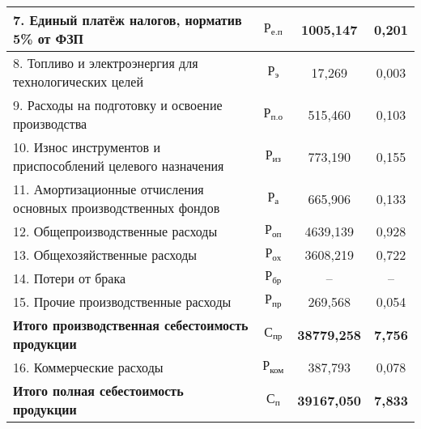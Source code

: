 {\begin{longtable}{| m{10.7cm} | c | c | c |}
      7. Единый платёж налогов, норматив 5\% от ФЗП
      & \( \text{Р}_{\text{е.п}} \) & 1005{,}147 & 0{,}201 \\
      \hline

      8. Топливо и электроэнергия для технологических целей
      & \( \text{Р}_{\text{э}} \) & 17{,}269 & 0{,}003 \\
      \hline

      9. Расходы на подготовку и освоение производства
      & \( \text{Р}_{\text{п.о}} \) & 515{,}460 & 0{,}103 \\
      \hline

      10. Износ инструментов и приспособлений \newline
      целевого назначения
      & \( \text{Р}_{\text{из}} \) & 773{,}190 & 0{,}155 \\
      \hline

      11. Амортизационные отчисления основных \newline 
      производственных фондов
      & \( \text{Р}_{\text{а}} \) & 665{,}906 & 0{,}133 \\
      \hline

      12. Общепроизводственные расходы
      & \( \text{Р}_{\text{оп}} \) & 4639{,}139 & 0{,}928 \\
      \hline

      13. Общехозяйственные расходы
      & \( \text{Р}_{\text{ох}} \) & 3608{,}219 & 0{,}722 \\
      \hline

      14. Потери от брака
      & \( \text{Р}_{\text{бр}} \) & -- & -- \\
      \hline

      15. Прочие производственные расходы
      & \( \text{Р}_{\text{пр}} \) & 269{,}568 & 0{,}054 \\
      \hline

      \textbf{Итого \newline производственная себестоимость продукции}
      & \( \mathbf{\text{С}_{\text{пр}}} \) & \textbf{38779{,}258} & \textbf{7{,}756} \\
      \hline

      16. Коммерческие расходы
      & \( \text{Р}_{\text{ком}} \) & 387{,}793 & 0{,}078 \\
      \hline

      \textbf{Итого \newline полная себестоимость продукции}
      & \( \mathbf{\text{С}_{\text{п}}} \) & \textbf{39167{,}050} & \textbf{7{,}833} \\
      \hline


\end{longtable}}
